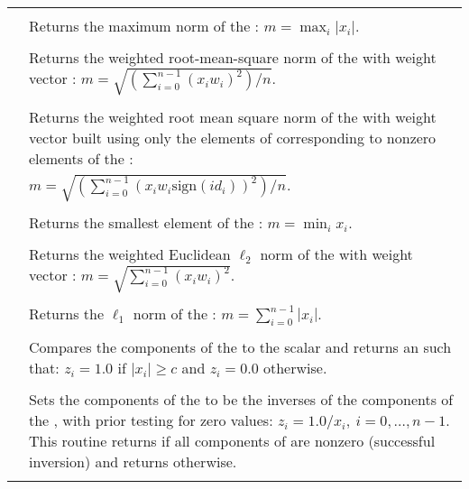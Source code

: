 \begin{supertabular}{|p{\colone}|p{\coltwo}|}
 &  \\
& Returns the maximum norm of the  :
$m = \max_{i} | x_i |$.
\\[2mm]
 &  \\
& Returns the weighted root-mean-square norm of the   with
weight vector :
$m = \sqrt{\left( \sum_{i=0}^{n-1} (x_i w_i)^2 \right) / n}$.
\\[2mm]
 &  \\
& Returns the weighted root mean square norm of the   with
weight vector  built using only the elements of  corresponding to
nonzero elements of the  :\\
&$m = \sqrt{\left( \sum_{i=0}^{n-1} (x_i w_i \text{sign}(id_i))^2 \right) / n}$.
\\[2mm]
 &  \\
& Returns the smallest element of the  :
$m = \min_i x_i $.
\\[2mm]
 &  \\
& Returns the weighted Euclidean $\ell_2$ norm of the  
with weight vector : 
$m = \sqrt{\sum_{i=0}^{n-1} (x_i w_i)^2}$.
\\[2mm]
 &  \\
& Returns the $\ell_1$ norm of the  :
$m = \sum_{i=0}^{n-1} | x_i |$.
\\[2mm]
 &  \\
& Compares the components of the   to the scalar
 and returns an   such that:
$z_i = 1.0$ if $| x_i | \ge c$ and $z_i = 0.0$ otherwise.
\\[2mm]
 &  \\
& Sets the components of the   to be the inverses
of the components of the  , with prior testing
for zero values:
$z_i = 1.0 /  x_i  , \: i=0,\ldots,n-1$.
This routine returns  if all components of  are
nonzero (successful inversion) and returns  otherwise.  
\\[2mm]
 &  \\

\end{supertabular}
